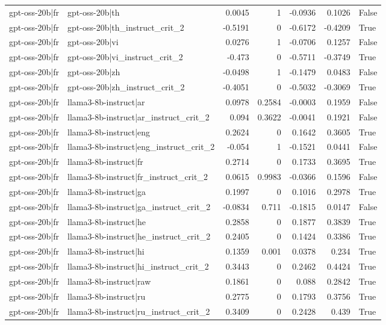 \begin{table}
\begin{tabular}{l l r r r r l}
gpt-oss-20b|fr & gpt-oss-20b|th & 0.0045 & 1 & -0.0936 & 0.1026 & False \\
gpt-oss-20b|fr & gpt-oss-20b|th_instruct_crit_2 & -0.5191 & 0 & -0.6172 & -0.4209 & True \\
gpt-oss-20b|fr & gpt-oss-20b|vi & 0.0276 & 1 & -0.0706 & 0.1257 & False \\
gpt-oss-20b|fr & gpt-oss-20b|vi_instruct_crit_2 & -0.473 & 0 & -0.5711 & -0.3749 & True \\
gpt-oss-20b|fr & gpt-oss-20b|zh & -0.0498 & 1 & -0.1479 & 0.0483 & False \\
gpt-oss-20b|fr & gpt-oss-20b|zh_instruct_crit_2 & -0.4051 & 0 & -0.5032 & -0.3069 & True \\
gpt-oss-20b|fr & llama3-8b-instruct|ar & 0.0978 & 0.2584 & -0.0003 & 0.1959 & False \\
gpt-oss-20b|fr & llama3-8b-instruct|ar_instruct_crit_2 & 0.094 & 0.3622 & -0.0041 & 0.1921 & False \\
gpt-oss-20b|fr & llama3-8b-instruct|eng & 0.2624 & 0 & 0.1642 & 0.3605 & True \\
gpt-oss-20b|fr & llama3-8b-instruct|eng_instruct_crit_2 & -0.054 & 1 & -0.1521 & 0.0441 & False \\
gpt-oss-20b|fr & llama3-8b-instruct|fr & 0.2714 & 0 & 0.1733 & 0.3695 & True \\
gpt-oss-20b|fr & llama3-8b-instruct|fr_instruct_crit_2 & 0.0615 & 0.9983 & -0.0366 & 0.1596 & False \\
gpt-oss-20b|fr & llama3-8b-instruct|ga & 0.1997 & 0 & 0.1016 & 0.2978 & True \\
gpt-oss-20b|fr & llama3-8b-instruct|ga_instruct_crit_2 & -0.0834 & 0.711 & -0.1815 & 0.0147 & False \\
gpt-oss-20b|fr & llama3-8b-instruct|he & 0.2858 & 0 & 0.1877 & 0.3839 & True \\
gpt-oss-20b|fr & llama3-8b-instruct|he_instruct_crit_2 & 0.2405 & 0 & 0.1424 & 0.3386 & True \\
gpt-oss-20b|fr & llama3-8b-instruct|hi & 0.1359 & 0.001 & 0.0378 & 0.234 & True \\
gpt-oss-20b|fr & llama3-8b-instruct|hi_instruct_crit_2 & 0.3443 & 0 & 0.2462 & 0.4424 & True \\
gpt-oss-20b|fr & llama3-8b-instruct|raw & 0.1861 & 0 & 0.088 & 0.2842 & True \\
gpt-oss-20b|fr & llama3-8b-instruct|ru & 0.2775 & 0 & 0.1793 & 0.3756 & True \\
gpt-oss-20b|fr & llama3-8b-instruct|ru_instruct_crit_2 & 0.3409 & 0 & 0.2428 & 0.439 & True \\

\end{tabular}
\end{table}
